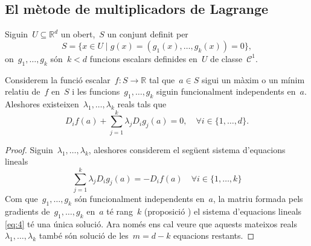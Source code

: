 \documentclass[../../main.tex]{subfiles}
\begin{document}
    \subsection{El mètode de multiplicadors de Lagrange} %
    \begin{theorem}
        \label{thm:Multiplicadors de Lagrange}
        Siguin~\(U\subseteq\mathbb{R}^{d}\) un obert,~\(S\) un conjunt definit per
        \[
            S=\{x\in U\mid g(x)=(g_{1}(x),\dots,g_{k}(x))=0\},
        \]
        on~\(g_{1},\dots,g_{k}\) són~\(k<d\) funcions escalars definides en~\(U\) de classe~\(\mathcal{C}^{1}\).

        Considerem la funció escalar~\(f\colon S\to\mathbb{R}\) tal que~\(a\in S\) sigui un màxim o un mínim relatiu de~\(f\) en~\(S\) i les funcions~\(g_{1},\dots,g_{k}\) siguin funcionalment independents en~\(a\).
        Aleshores existeixen~\(\lambda_{1},\dots,\lambda_{k}\) reals tals que
        \[
            D_{i}f(a)+\sum_{j=1}^{k}\lambda_{j}D_{i}g_{j}(a)=0,\quad\forall i\in\{1,\dots,d\}.
        \]
        \begin{proof}
            Siguin~\(\lambda_{1},\dots,\lambda_{k}\), aleshores considerem el següent sistema d'equacions lineals
            \begin{equation}\label{eq:4}
            \sum_{j=1}^{k}\lambda_{j}D_{i}g_{j}(a)=-D_{i}f(a)\quad\forall i\in\{1,\dots,k\}
            \end{equation}
            Com que~\(g_{1},\dots,g_{k}\) són funcionalment independents en~\(a\), la matriu formada pels gradients de~\(g_{1},\dots,g_{k}\) en~\(a\) té rang~\(k\) (proposició ) el sistema d'equacions lineals \eqref{eq:4} té una única solució.
            Ara només ens cal veure que aquests mateixos reals~\(\lambda_{1},\dots,\lambda_{k}\) també són solució de les~\(m=d-k\) equacions restants.


\end{proof}
\end{theorem}
\end{document}
